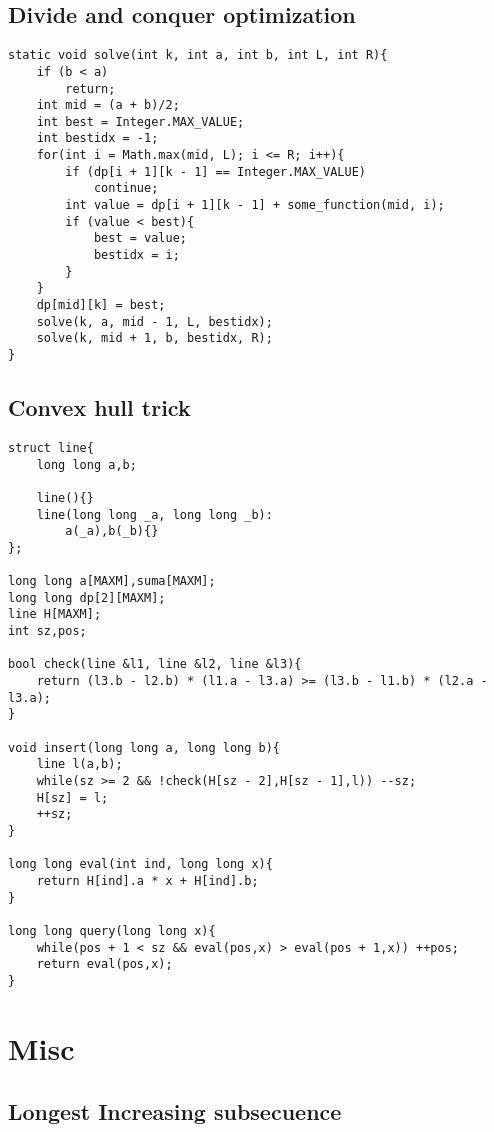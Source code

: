 \documentclass[10pt,letterpaper,twocolumn,twosided]{article}
\begin{document}
\subsection{Divide and conquer optimization}

\begin{lstlisting}
static void solve(int k, int a, int b, int L, int R){
	if (b < a)
		return;
	int mid = (a + b)/2;
	int best = Integer.MAX_VALUE;
	int bestidx = -1;
	for(int i = Math.max(mid, L); i <= R; i++){
		if (dp[i + 1][k - 1] == Integer.MAX_VALUE)
			continue;
		int value = dp[i + 1][k - 1] + some_function(mid, i);
		if (value < best){
			best = value;
			bestidx = i;
		}
	}
	dp[mid][k] = best;
	solve(k, a, mid - 1, L, bestidx);
	solve(k, mid + 1, b, bestidx, R);
}
\end{lstlisting}

\subsection{Convex hull trick}

\begin{lstlisting}
struct line{
    long long a,b;
    
    line(){}
    line(long long _a, long long _b):
        a(_a),b(_b){}
};

long long a[MAXM],suma[MAXM];
long long dp[2][MAXM];
line H[MAXM];
int sz,pos;

bool check(line &l1, line &l2, line &l3){
    return (l3.b - l2.b) * (l1.a - l3.a) >= (l3.b - l1.b) * (l2.a - l3.a);
}

void insert(long long a, long long b){
    line l(a,b);
    while(sz >= 2 && !check(H[sz - 2],H[sz - 1],l)) --sz;
    H[sz] = l;
    ++sz;
}

long long eval(int ind, long long x){
    return H[ind].a * x + H[ind].b;
}

long long query(long long x){
    while(pos + 1 < sz && eval(pos,x) > eval(pos + 1,x)) ++pos;
    return eval(pos,x);
}
\end{lstlisting}

\section{Misc}

\subsection{Longest Increasing subsecuence}
\end{document}
